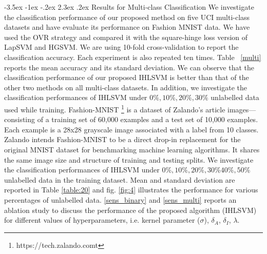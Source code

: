 \documentclass[12pt,a4paper,oneside,english]{report}
\makeatletter
\renewcommand\subsubsection{\@startsection {subsubsection}{1}{\z@}%
                                   {-3.5ex \@plus -1ex \@minus -.2ex}%
                                   {2.3ex \@plus.2ex}%
                                   {\centering\normalfont\large\bfseries}}
\makeatother
\begin{document}
\subsubsection{Results for Multi‑class Classification}
We investigate the classification performance of our proposed method on five UCI multi-class datasets and have evaluate its performance on Fashion MNIST data. We have used the OVR\cite{rifkin2004defense} strategy and compared it with the square-hinge loss version of LapSVM and HGSVM. We are using 10-fold cross-validation to report the classification accuracy.
Each experiment is also repeated ten times. Table ~\ref{multi} reports the mean accuracy and its standard deviation. We can observe that the classification performance of our proposed IHLSVM is better than that of the other two methods on all multi-class datasets. In addition, we investigate the classification performances of IHLSVM under \(0 \%, 10 \%, 20 \%, 30 \% \) unlabelled data used while training. Fashion-MNIST \footnote{https://tech.zalando.comt} is a dataset of Zalando's article images—consisting of a training set of 60,000 examples and a test set of 10,000 examples. Each example is a 28x28 grayscale image associated with a label from 10 classes. Zalando intends Fashion-MNIST to be a direct drop-in replacement for the original MNIST dataset for benchmarking machine learning algorithms. It shares the same image size and structure of training and testing splits. We investigate the classification performances of IHLSVM under \(0 \%, 10 \%, 20 \%, 30 \% 40 \%, 50 \%\) unlabelled data in the training dataset. Mean and standard deviation are reported in Table \ref{table:20} and fig. \ref{fig:4} illustrates the performance for various percentages of unlabelled data. \ref{sens_binary} and \ref{sens_multi} reports an ablation study to discuss the performance of the proposed algorithm (IHLSVM) for different values of hyperparameters, i.e. kernel parameter ($\sigma$), $\delta_A$, $\delta_I$, $\lambda$.
\end{document}
